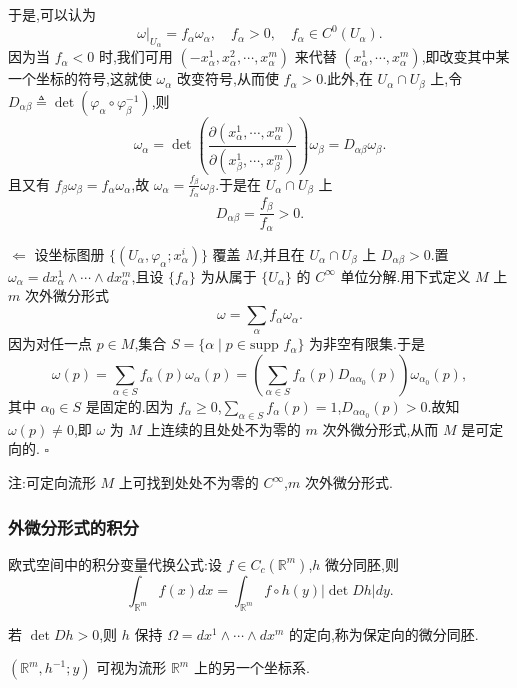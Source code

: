 于是,可以认为
\[
\omega|_{U_{\alpha}} = f_{\alpha} \omega_{\alpha}, \quad f_{\alpha} > 0, \quad f_{\alpha} \in C^{0}(U_{\alpha}).
\]
因为当 $f_{\alpha} < 0$ 时,我们可用 $(-x_{\alpha}^{1}, x_{\alpha}^{2}, \cdots, x_{\alpha}^{m})$ 来代替 $(x_{\alpha}^{1}, \cdots, x_{\alpha}^{m})$,即改变其中某一个坐标的符号,这就使 $\omega_{\alpha}$ 改变符号,从而使 $f_{\alpha} > 0$.此外,在 $U_{\alpha} \cap U_{\beta}$ 上,令 $D_{\alpha \beta} \triangleq \det(\varphi_\alpha \circ \varphi_\beta^{-1})$,则
\[
\omega_{\alpha} = \det \left( \frac{\partial (x_{\alpha}^{1}, \cdots, x_{\alpha}^{m})}{\partial (x_{\beta}^{1}, \cdots, x_{\beta}^{m})} \right) \omega_{\beta} = D_{\alpha \beta} \omega_{\beta}.
\]
且又有 $f_{\beta} \omega_{\beta} = f_{\alpha} \omega_{\alpha}$,故 $\omega_{\alpha} = \frac{f_{\beta}}{f_{\alpha}} \omega_{\beta}$.于是在 $U_{\alpha} \cap U_{\beta}$ 上
\[
D_{\alpha \beta} = \frac{f_{\beta}}{f_{\alpha}} > 0.
\]

$\Leftarrow$ 设坐标图册 $\{(U_\alpha, \varphi_\alpha; x_{\alpha}^{i})\}$ 覆盖 $M$,并且在 $U_\alpha \cap U_\beta$ 上 $D_{\alpha \beta} > 0$.置 $\omega_{\alpha} = dx_{\alpha}^{1} \wedge \cdots \wedge dx_{\alpha}^{m}$,且设 $\{f_{\alpha}\}$ 为从属于 $\{U_\alpha\}$ 的 $C^{\infty}$ 单位分解.用下式定义 $M$ 上 $m$ 次外微分形式
\[
\omega = \sum_{\alpha} f_{\alpha} \omega_{\alpha}.
\]
因为对任一点 $p \in M$,集合 $S = \{\alpha \mid p \in \text{supp } f_{\alpha}\}$ 为非空有限集.于是
\[
\omega(p) = \sum_{\alpha \in S} f_{\alpha}(p) \omega_{\alpha}(p) = \left( \sum_{\alpha \in S} f_{\alpha}(p) D_{\alpha \alpha_0}(p) \right) \omega_{\alpha_0}(p),
\]
其中 $\alpha_0 \in S$ 是固定的.因为 $f_{\alpha} \geq 0$,$\sum_{\alpha \in S} f_{\alpha}(p) = 1$,$D_{\alpha \alpha_0}(p) > 0$.故知 $\omega(p) \neq 0$,即 $\omega$ 为 $M$ 上连续的且处处不为零的 $m$ 次外微分形式,从而 $M$ 是可定向的. $\square$

注:可定向流形 $M$ 上可找到处处不为零的 $C^{\infty}$,$m$ 次外微分形式.

\subsubsection{外微分形式的积分}

欧式空间中的积分变量代换公式:设 $f \in C_c(\mathbb{R}^m)$,$h$ 微分同胚,则
\[
\int_{\mathbb{R}^m} f(x)dx = \int_{\mathbb{R}^m} f \circ h(y)|\det Dh|dy.
\]

若 $\det Dh > 0$,则 $h$ 保持 $\Omega = dx^1 \wedge \cdots \wedge dx^m$ 的定向,称为保定向的微分同胚.

$(\mathbb{R}^m, h^{-1}; y)$ 可视为流形 $\mathbb{R}^m$ 上的另一个坐标系.


